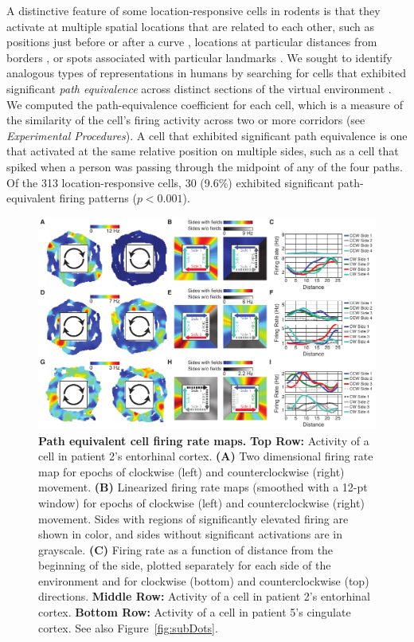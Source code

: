 A distinctive feature of some location-responsive cells in rodents is that they activate at multiple  spatial locations that are related to each other, such as positions just before or after a curve \cite{FranEtal00}, locations at particular distances from borders \cite{SolsEtal08,DerdEtal09,BjerEtal14}, or spots associated with particular landmarks \cite{HargEtal05,TsaoEtal13}.  We sought to identify analogous  types of representations in humans by searching for cells that exhibited significant \emph{path equivalence} across distinct sections of the virtual environment \cite{FranEtal00}.  We computed the path-equivalence coefficient for each cell, which is a measure of the similarity of the cell's firing activity across two or more corridors (see \emph{Experimental Procedures}).  A cell that exhibited significant path equivalence is one that activated at the same relative position on multiple sides, such as a cell that spiked when a person was passing through the midpoint of any of the four paths.  Of the 313 location-responsive cells, 30 (9.6\%) exhibited significant path-equivalent firing patterns ($p<0.001$).


\begin{figure}[t]
\centering
\includegraphics[width=.99\textwidth]{./tex/linearGrids/figs/Figure2}
\caption[Path equivalent cell firing rate maps]{\textbf{Path equivalent cell firing rate maps.} \textbf{Top Row:} Activity of a cell in patient 2's entorhinal cortex. \textbf{(A)} Two dimensional firing rate map for epochs of clockwise (left) and counterclockwise (right) movement. \textbf{(B)} Linearized firing rate maps (smoothed with a 12-pt window) for epochs of clockwise (left) and counterclockwise (right) movement. Sides with regions of significantly elevated firing are shown in color, and sides without significant activations are in grayscale. \textbf{(C)} Firing rate as a function of distance from the beginning of the side, plotted separately for each side of the environment and for clockwise (bottom) and counterclockwise (top) directions. \textbf{Middle Row:} Activity of a cell in patient 2's  entorhinal cortex. \textbf{Bottom Row:} Activity of a cell in patient 5's cingulate cortex. See also Figure~\ref{fig:subDots}.}
\label{fig:firingExamples}
\end{figure}

